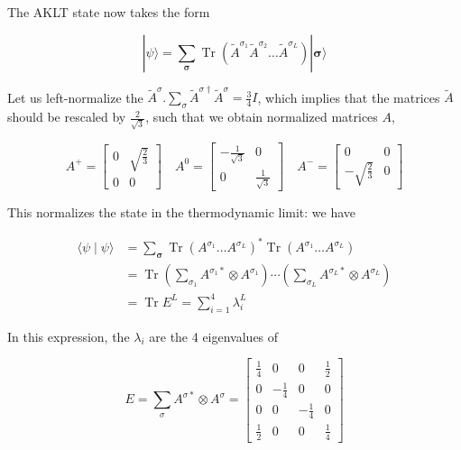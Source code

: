 \documentclass[12pt]{article}
\begin{document}
The AKLT state now takes the form


\begin{equation*}
|\psi\rangle=\sum_{\boldsymbol{\sigma}} \operatorname{Tr}\left(\tilde{A}^{\sigma_{1}} \tilde{A}^{\sigma_{2}} \ldots \tilde{A}^{\sigma_{L}}\right)|\boldsymbol{\sigma}\rangle \tag{90}
\end{equation*}


Let us left-normalize the $\tilde{A}^{\sigma} . \sum_{\sigma} \tilde{A}^{\sigma \dagger} \tilde{A}^{\sigma}=\frac{3}{4} I$, which implies that the matrices $\tilde{A}$ should be rescaled by $\frac{2}{\sqrt{3}}$, such that we obtain normalized matrices $A$,

\[
A^{+}=\left[\begin{array}{cc}
0 & \sqrt{\frac{2}{3}}  \tag{91}\\
0 & 0
\end{array}\right] \quad A^{0}=\left[\begin{array}{cc}
-\frac{1}{\sqrt{3}} & 0 \\
0 & \frac{1}{\sqrt{3}}
\end{array}\right] \quad A^{-}=\left[\begin{array}{cc}
0 & 0 \\
-\sqrt{\frac{2}{3}} & 0
\end{array}\right]
\]

This normalizes the state in the thermodynamic limit: we have

$$
\begin{aligned}
\langle\psi \mid \psi\rangle & =\sum_{\boldsymbol{\sigma}} \operatorname{Tr}\left(A^{\sigma_{1}} \ldots A^{\sigma_{L}}\right)^{*} \operatorname{Tr}\left(A^{\sigma_{1}} \ldots A^{\sigma_{L}}\right) \\
& =\operatorname{Tr}\left(\sum_{\sigma_{1}} A^{\sigma_{1} *} \otimes A^{\sigma_{1}}\right) \cdots\left(\sum_{\sigma_{L}} A^{\sigma_{L} *} \otimes A^{\sigma_{L}}\right) \\
& =\operatorname{Tr} E^{L}=\sum_{i=1}^{4} \lambda_{i}^{L}
\end{aligned}
$$

In this expression, the $\lambda_{i}$ are the 4 eigenvalues of

\[
E=\sum_{\sigma} A^{\sigma *} \otimes A^{\sigma}=\left[\begin{array}{cccc}
\frac{1}{4} & 0 & 0 & \frac{1}{2}  \tag{92}\\
0 & -\frac{1}{4} & 0 & 0 \\
0 & 0 & -\frac{1}{4} & 0 \\
\frac{1}{2} & 0 & 0 & \frac{1}{4}
\end{array}\right]
\]
\end{document}

